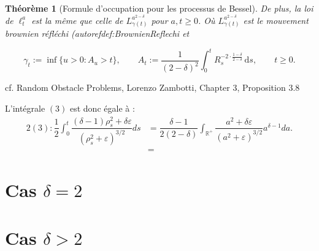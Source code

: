 \documentclass[openany]{book}
\makeatletter
\newcommand{\R}{\mathbb{R}}
\newcommand{\1}{\mathbbm{1}}
\renewenvironment{proof}[1][\textbf{\textit{Démonstration}}]{%
  \par\pushQED{\qed}%
  \normalfont\topsep6\p@\@plus6\p@\relax
  \trivlist\item[\hskip\labelsep
    #1\@addpunct{.}]\ignorespaces
}{%
  \popQED\endtrivlist\@endpefalse
}
\theoremstyle{thmfont}
\newtheorem{theorem}{Théorème}[chapter]
\theoremstyle{deffont}
\theoremstyle{thmfont}
\theoremstyle{deffont}
\makeatother
\begin{document}
\begin{proof}
\begin{theorem}[Formule d'occupation pour les processus de Bessel]
De plus, la loi de $\ell_t^a$ est la même que celle de $L_{\gamma(t)}^{a^{2-\delta}}$ pour $a, t \geq 0$. Où $L_{\gamma(t)}^{a^{2-\delta}}$ est le mouvement brownien réfléchi (autoref{def:BrownienReflechi} et

  $$\gamma_t := \inf\{ u > 0 : A_u > t \}, \qquad
A_t := \frac{1}{(2 - \delta)^2} \int_0^t R_s^{-2 \cdot \frac{1 - \delta}{2 - \delta}} \, \mathrm{d}s, \qquad t \geq 0.
$$
\end{theorem}
\begin{proof}cf. Random Obstacle Problems, Lorenzo Zambotti, Chapter 3, Proposition 3.8
\end{proof}

L'intégrale $(3)$ est donc égale à :
\begin{alignat*}{2}
  (3) : \dfrac{1}{2} \int_0^t \dfrac{(\delta -1)\rho_s^2 + \delta \varepsilon}{(\rho_s^2 + \varepsilon)^{3/2}}ds &= \dfrac{\delta -1}{2(2 - \delta)}\int_{\R^+} \dfrac{a^2 + \delta \varepsilon}{(a^2 + \varepsilon)^{3/2}} a^{\delta-1}da.\\
  &= 
\end{alignat*}

\end{proof}
\section{Cas $\delta = 2 $}
\section{Cas $\delta > 2 $}
\end{document}
